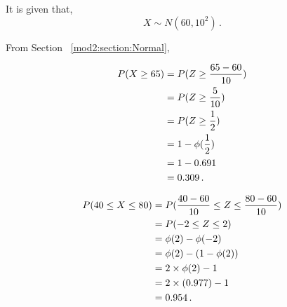 \begin{subquestions}
\subquestion

It is given that,
\begin{equation}
	X \sim N(60, 10^2) \,.
\end{equation}

From Section ~\ref{mod2:section:Normal},

\begin{subsubquestions}
	
\subsubquestion

\begin{align}
	P(X \geq 65) & = P(Z \geq \frac{65-60}{10}) \nonumber \\
	             & = P(Z \geq \frac{5}{10}) \nonumber \\
	             & = P(Z \geq \frac{1}{2}) \nonumber \\
	             & = 1 - \phi(\frac{1}{2}) \nonumber \\
	             & = 1 - 0.691 \nonumber \\
	             & = 0.309 \,.	
\end{align}


\subsubquestion

\begin{align}
	P(40 \leq X \leq 80) & = P(\frac{40-60}{10} \leq Z \leq \frac{80-60}{10}) \nonumber \\
						 & = P(-2 \leq Z \leq 2) \nonumber \\
						 & = \phi(2) - \phi(-2) \nonumber \\
						 & = \phi(2) - (1 - \phi(2)) \nonumber \\
						 & = 2 \times \phi(2) - 1 \nonumber \\
						 & = 2 \times (0.977) - 1 \nonumber \\
						 & = 0.954 \,.
\end{align}


\end{subsubquestions}

\end{subquestions}

